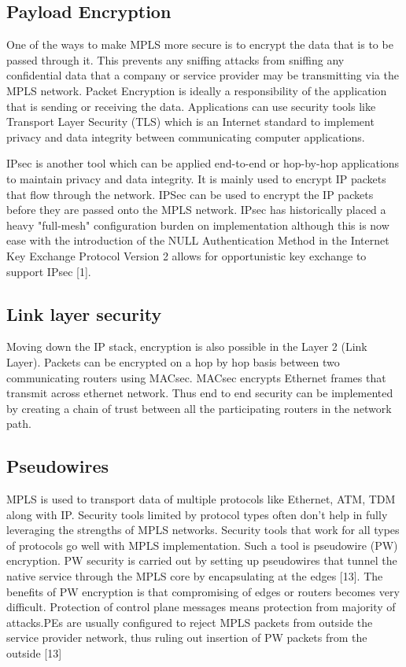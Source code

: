 \subsection{Payload Encryption}
One of the ways to make MPLS more secure is to encrypt the data that is to be passed through it. This prevents any sniffing attacks from sniffing any confidential data that a company or service provider may be transmitting via the MPLS network. Packet Encryption is ideally a responsibility of the application that is sending or receiving the data. Applications can use security tools like Transport Layer Security (TLS) which is an Internet standard to implement privacy and data integrity between communicating computer applications.

IPsec is another tool which can be applied end-to-end or hop-by-hop applications to maintain privacy and data integrity. It is mainly used to encrypt IP packets that flow through the network. IPSec can be used to encrypt the IP packets before they are passed onto the MPLS network. IPsec has historically placed a heavy "full-mesh" configuration burden on implementation although this is now ease with the introduction of the NULL Authentication Method in the Internet Key Exchange Protocol Version 2 allows for opportunistic key exchange to support IPsec [1].

\subsection{Link layer security}
Moving down the IP stack, encryption is also possible in the Layer 2 (Link Layer). Packets can be encrypted on a hop by hop basis between two communicating routers using MACsec. MACsec encrypts Ethernet frames that transmit across ethernet network. Thus end to end security can be implemented by creating a chain of trust between all the participating routers in the network path.

\subsection{Pseudowires}
MPLS is used to transport data of multiple protocols like Ethernet, ATM, TDM along with IP. Security tools limited by protocol types often don't help in fully leveraging the strengths of MPLS networks. Security tools that work for all types of protocols go well with MPLS implementation. Such a tool is pseudowire (PW) encryption. PW security is carried out by setting up pseudowires that tunnel the native service through the MPLS core by encapsulating at the edges [13]. The benefits of PW encryption is that compromising of edges or routers becomes very difficult. Protection of control plane messages means protection from majority of attacks.PEs are usually configured to reject MPLS packets from outside the
service provider network, thus ruling out insertion of PW packets \cite{GRAYSON2009146}
from the outside [13]


